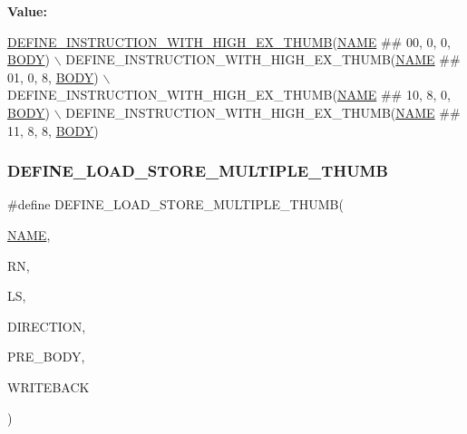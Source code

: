{\bfseries Value\+:}
\begin{DoxyCode}
\mbox{\hyperlink{isa-thumb_8c_ab899da842835d2ec664c1a915eee22e1}{DEFINE\_INSTRUCTION\_WITH\_HIGH\_EX\_THUMB}}(\mbox{\hyperlink{inflate_8h_a164ea0159d5f0b5f12a646f25f99eceaa67bc2ced260a8e43805d2480a785d312}{NAME}} ## 00, 0, 0, 
      \mbox{\hyperlink{gzlog_8c_aa6bdf6a6d9916c343e1e17774d84a156}{BODY}}) \(\backslash\)
    DEFINE\_INSTRUCTION\_WITH\_HIGH\_EX\_THUMB(\mbox{\hyperlink{inflate_8h_a164ea0159d5f0b5f12a646f25f99eceaa67bc2ced260a8e43805d2480a785d312}{NAME}} ## 01, 0, 8, \mbox{\hyperlink{gzlog_8c_aa6bdf6a6d9916c343e1e17774d84a156}{BODY}}) \(\backslash\)
    DEFINE\_INSTRUCTION\_WITH\_HIGH\_EX\_THUMB(\mbox{\hyperlink{inflate_8h_a164ea0159d5f0b5f12a646f25f99eceaa67bc2ced260a8e43805d2480a785d312}{NAME}} ## 10, 8, 0, \mbox{\hyperlink{gzlog_8c_aa6bdf6a6d9916c343e1e17774d84a156}{BODY}}) \(\backslash\)
    DEFINE\_INSTRUCTION\_WITH\_HIGH\_EX\_THUMB(\mbox{\hyperlink{inflate_8h_a164ea0159d5f0b5f12a646f25f99eceaa67bc2ced260a8e43805d2480a785d312}{NAME}} ## 11, 8, 8, \mbox{\hyperlink{gzlog_8c_aa6bdf6a6d9916c343e1e17774d84a156}{BODY}})
\end{DoxyCode}
\mbox{\label{isa-thumb_8c_a3adfa9d9d616a26c0d455a043d45d2ba}} 
\subsubsection{\texorpdfstring{D\+E\+F\+I\+N\+E\+\_\+\+L\+O\+A\+D\+\_\+\+S\+T\+O\+R\+E\+\_\+\+M\+U\+L\+T\+I\+P\+L\+E\+\_\+\+T\+H\+U\+MB}{DEFINE\_LOAD\_STORE\_MULTIPLE\_THUMB}}
{\footnotesize\ttfamily \#define D\+E\+F\+I\+N\+E\+\_\+\+L\+O\+A\+D\+\_\+\+S\+T\+O\+R\+E\+\_\+\+M\+U\+L\+T\+I\+P\+L\+E\+\_\+\+T\+H\+U\+MB(\begin{DoxyParamCaption}\item[{}]{\mbox{\hyperlink{inflate_8h_a164ea0159d5f0b5f12a646f25f99eceaa67bc2ced260a8e43805d2480a785d312}{N\+A\+ME}},  }\item[{}]{RN,  }\item[{}]{LS,  }\item[{}]{D\+I\+R\+E\+C\+T\+I\+ON,  }\item[{}]{P\+R\+E\+\_\+\+B\+O\+DY,  }\item[{}]{W\+R\+I\+T\+E\+B\+A\+CK }\end{DoxyParamCaption})}

